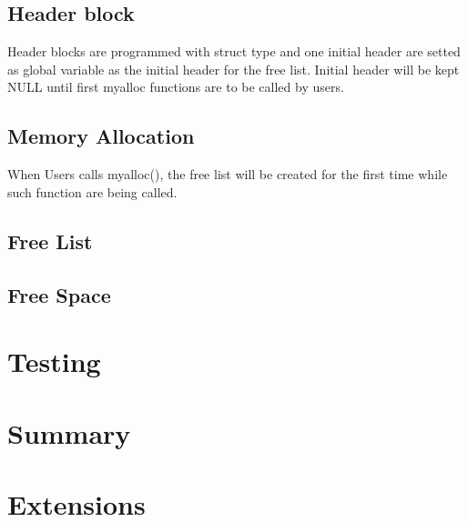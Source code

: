 \documentclass[legalpaper]{article}
\begin{document}
	\subsection{Header block}
	Header blocks are programmed with struct type and one initial header are setted as global variable as the initial header for the free list. Initial header will be kept NULL until first myalloc functions are to be called by users.
	\subsection{Memory Allocation}
	When Users calls myalloc(), the free list will be created for the first time while such function are being called.
	\subsection{Free List}
	\subsection{Free Space} 	

	
	\section{Testing}
	
	\section{Summary}
	
	\section{Extensions}
\end{document}
